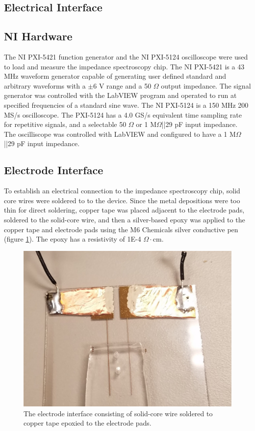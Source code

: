\subsection{Electrical Interface}

\subsection*{NI Hardware}
\par The NI PXI-5421 function generator and the NI PXI-5124 oscilloscope were used to load and measure the impedance spectroscopy chip. The NI PXI-5421 is a 43 MHz waveform generator capable of generating user defined standard and arbitrary waveforms with a $\pm$6 V range and a 50 $\Omega$ output impedance. The signal generator was controlled with the LabVIEW program and operated to run at specified frequencies of a standard sine wave. The NI PXI-5124 is a 150 MHz 200 MS/s oscilloscope. The PXI-5124 has a 4.0 GS/s equivalent time sampling rate for repetitive signals, and a selectable 50 $\Omega$ or 1 M$\Omega$||29 pF input impedance. The oscilliscope was controlled with LabVIEW and configured to have a 1 M$\Omega$||29 pF input impedance.

\subsection*{Electrode Interface}
\par To establish an electrical connection to the impedance spectroscopy chip, solid core wires were soldered to to the device. Since the metal depositions were too thin for direct soldering, copper tape was placed adjacent to the electrode pads, soldered to the solid-core wire, and then a silver-based epoxy was applied to the copper tape and electrode pads using the M6 Chemicals silver conductive pen (figure \ref{fig:electrode_interface}). The epoxy has a resistivity of 1E-4 $\Omega\cdot$cm.

\begin{figure}[h]
    \centering
    \includegraphics[width=\textwidth]{images/electrod_interface.jpg}
    \caption[Electrode interface]{The electrode interface consisting of solid-core wire soldered to copper tape epoxied to the electrode pads.}
    \label{fig:electrode_interface}
\end{figure}

